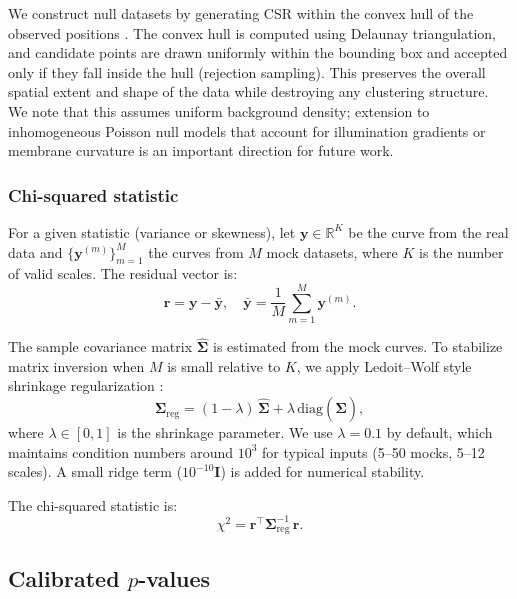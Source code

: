 \documentclass[11pt]{article}
\begin{document}
We construct null datasets by generating CSR within the convex hull of
the observed positions \citep{diggle2013}. The convex hull is computed
using Delaunay triangulation, and candidate points are drawn uniformly
within the bounding box and accepted only if they fall inside the hull
(rejection sampling). This preserves the overall spatial extent and
shape of the data while destroying any clustering structure. We note that
this assumes uniform background density; extension to inhomogeneous
Poisson null models that account for illumination gradients or membrane
curvature is an important direction for future work.

\subsubsection{Chi-squared statistic}

For a given statistic (variance or skewness), let
$\mathbf{y} \in \mathbb{R}^K$ be the curve from the real data and
$\{\mathbf{y}^{(m)}\}_{m=1}^{M}$ the curves from $M$ mock datasets,
where $K$ is the number of valid scales. The residual vector is:
\begin{equation}
  \mathbf{r} = \mathbf{y} - \bar{\mathbf{y}},
  \quad
  \bar{\mathbf{y}} = \frac{1}{M} \sum_{m=1}^{M} \mathbf{y}^{(m)}.
  \label{eq:residual}
\end{equation}

The sample covariance matrix $\hat{\boldsymbol{\Sigma}}$ is estimated
from the mock curves. To stabilize matrix inversion when $M$ is small
relative to $K$, we apply Ledoit--Wolf style shrinkage regularization
\citep{ledoit2004}:
\begin{equation}
  \boldsymbol{\Sigma}_\mathrm{reg} =
    (1 - \lambda)\,\hat{\boldsymbol{\Sigma}}
    + \lambda\,\mathrm{diag}(\hat{\boldsymbol{\Sigma}}),
  \label{eq:shrinkage}
\end{equation}
where $\lambda \in [0, 1]$ is the shrinkage parameter. We use
$\lambda = 0.1$ by default, which maintains condition numbers around
$10^3$ for typical inputs (5--50 mocks, 5--12 scales). A small ridge
term ($10^{-10} \mathbf{I}$) is added for numerical stability.

The chi-squared statistic is:
\begin{equation}
  \chi^2 = \mathbf{r}^\top
    \boldsymbol{\Sigma}_\mathrm{reg}^{-1}\,\mathbf{r}.
  \label{eq:chi2}
\end{equation}

\subsection{Calibrated $p$-values}
\label{sec:calibrated-pvalues}
\end{document}

